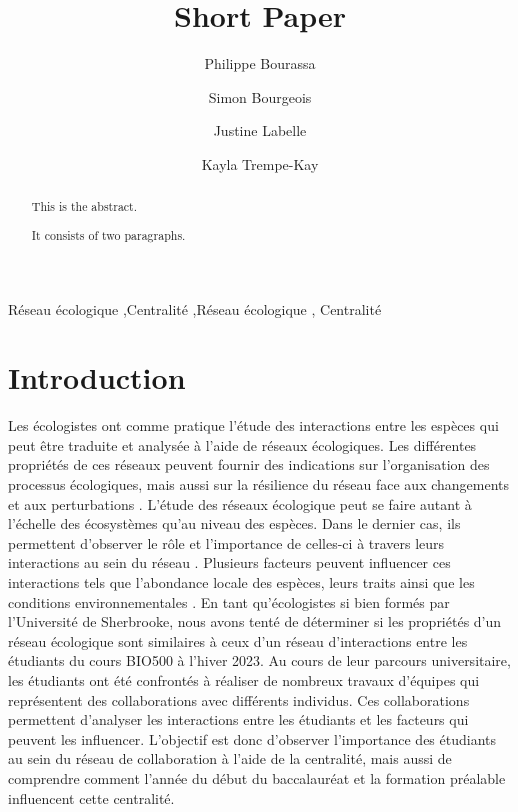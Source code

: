 \documentclass[preprint, 3p,
authoryear]{elsarticle} %
\begin{document}
\begin{frontmatter}

  \title{Short Paper}
    \author[]{Philippe Bourassa%
  }
    \author[]{Simon Bourgeois%
  }
    \author[]{Justine Labelle%
  }
    \author[]{Kayla Trempe-Kay%
  }
  
  \begin{abstract}
  This is the abstract.

  It consists of two paragraphs.
  \end{abstract}
    \begin{keyword}
    Réseau écologique \sep Centralité \sep Réseau écologique \sep 
    Centralité
  \end{keyword}
  
 \end{frontmatter}

\hypertarget{introduction}{%
\section{Introduction}\label{introduction}}

Les écologistes ont comme pratique l'étude des interactions entre les
espèces qui peut être traduite et analysée à l'aide de réseaux
écologiques. Les différentes propriétés de ces réseaux peuvent fournir
des indications sur l'organisation des processus écologiques, mais aussi
sur la résilience du réseau face aux changements et aux perturbations
\citet{delmas2019analysing}. L'étude des réseaux écologique peut se
faire autant à l'échelle des écosystèmes qu'au niveau des espèces. Dans
le dernier cas, ils permettent d'observer le rôle et l'importance de
celles-ci à travers leurs interactions au sein du réseau
\citet{delmas2019analysing}. Plusieurs facteurs peuvent influencer ces
interactions tels que l'abondance locale des espèces, leurs traits ainsi
que les conditions environnementales \citet{delmas2019analysing}. En
tant qu'écologistes si bien formés par l'Université de Sherbrooke, nous
avons tenté de déterminer si les propriétés d'un réseau écologique sont
similaires à ceux d'un réseau d'interactions entre les étudiants du
cours BIO500 à l'hiver 2023. Au cours de leur parcours universitaire,
les étudiants ont été confrontés à réaliser de nombreux travaux
d'équipes qui représentent des collaborations avec différents individus.
Ces collaborations permettent d'analyser les interactions entre les
étudiants et les facteurs qui peuvent les influencer. L'objectif est
donc d'observer l'importance des étudiants au sein du réseau de
collaboration à l'aide de la centralité, mais aussi de comprendre
comment l'année du début du baccalauréat et la formation préalable
influencent cette centralité.
\end{document}
